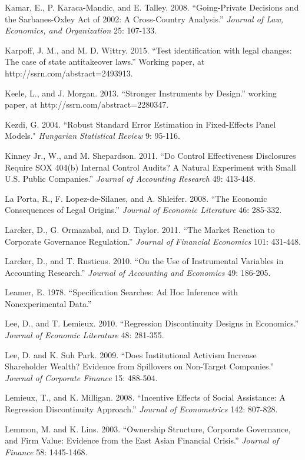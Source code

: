 \noindent Kamar, E., P. Karaca-Mandic, and E. Talley. 2008. ``Going-Private Decisions and the Sarbanes-Oxley Act of 2002: A Cross-Country Analysis.'' \textit{ Journal of Law, Economics, and Organization} 25: 107-133.

\noindent Karpoff, J. M., and M. D. Wittry.  2015.  ``Test identification with legal changes:  The case of state antitakeover laws.''  Working paper, at http://ssrn.com/abstract=2493913. 

\noindent Keele, L., and J. Morgan. 2013. ``Stronger Instruments by Design.'' working paper, at http://ssrn.com/abstract=2280347. \textbf{}

\noindent Kezdi, G. 2004. ``Robust Standard Error Estimation in Fixed-Effects Panel Models." \textit{Hungarian Statistical Review} 9: 95-116.

\noindent Kinney Jr., W., and M. Shepardson. 2011. ``Do Control Effectiveness Disclosures Require SOX 404(b) Internal Control Audits? A Natural Experiment with Small U.S. Public Companies.'' \textit{Journal of Accounting Research} 49: 413-448.

\noindent La Porta, R., F. Lopez-de-Silanes, and A. Shleifer. 2008. ``The Economic Consequences of Legal Origins.'' \textit{Journal of Economic Literature} 46: 285-332.

\noindent Larcker, D., G. Ormazabal, and D. Taylor. 2011. ``The Market Reaction to Corporate Governance Regulation.''  \textit{Journal of Financial Economics }101: 431-448.

\noindent Larcker, D., and T. Rusticus. 2010. ``On the Use of Instrumental Variables in Accounting Research.'' \textit{Journal of Accounting and Economics} 49: 186-205.

\noindent Leamer, E. 1978. ``Specification Searches:  Ad Hoc Inference with Nonexperimental Data.''

\noindent Lee, D., and T. Lemieux. 2010. ``Regression Discontinuity Designs in Economics.''  \textit{Journal of Economic Literature} 48: 281-355.

\noindent Lee, D. and K. Suh Park. 2009. ``Does Institutional Activism Increase Shareholder Wealth? Evidence from Spillovers on Non-Target Companies.'' \textit{Journal of Corporate Finance} 15: 488-504.

\noindent Lemieux, T., and K. Milligan. 2008. ``Incentive Effects of Social Assistance:  A Regression Discontinuity Approach.''  \textit{Journal of Econometrics} 142: 807-828.

\noindent Lemmon, M. and K. Lins. 2003. ``Ownership Structure, Corporate Governance, and Firm Value: Evidence from the East Asian Financial Crisis.''  \textit{Journal of Finance} 58: 1445-1468.


